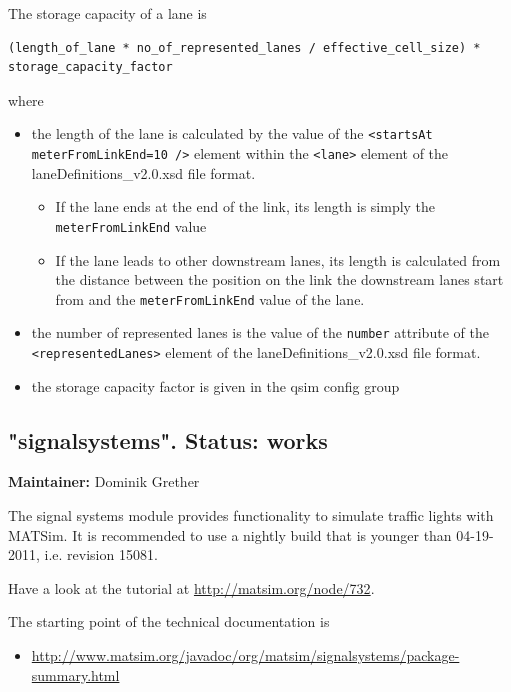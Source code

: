 The storage capacity of a lane is

\begin{lstlisting}
(length_of_lane * no_of_represented_lanes / effective_cell_size) * storage_capacity_factor
\end{lstlisting}

where
\begin{itemize}
	\item the length of the lane is calculated by the value of the \verb$<startsAt meterFromLinkEnd=10 />$ element within the \verb$<lane>$ element of the laneDefinitions\_v2.0.xsd file format. \\
		\begin{itemize}
			\item If the lane ends at the end of the link, its length is simply the \verb$meterFromLinkEnd$ value
			\item If the lane leads to other downstream lanes, its length is calculated from the distance between the position on the link the downstream lanes start from and the \verb$meterFromLinkEnd$ value of the lane. 
		\end{itemize}
	\item the number of represented lanes is the value of the \verb$number$ attribute of the  \verb$<representedLanes>$ element of the laneDefinitions\_v2.0.xsd file format.
	\item the storage capacity factor is given in the qsim config group
\end{itemize}


\vfill\eject
\subsection{"signalsystems". Status: works}

\textbf{Maintainer:} Dominik Grether

The signal systems module provides functionality to simulate traffic  lights with MATSim. It is recommended to use a nightly build that is  younger than 04-19-2011, i.e. revision 15081.

Have a look at the tutorial at \href{http://matsim.org/node/732}{http://matsim.org/node/732}.

The starting point of the technical documentation is
\begin{itemize}
	\item \href{http://www.matsim.org/javadoc/org/matsim/signalsystems/package-summary.html}{http://www.matsim.org/javadoc/org/matsim/signalsystems/package-summary.html}
\end{itemize}

